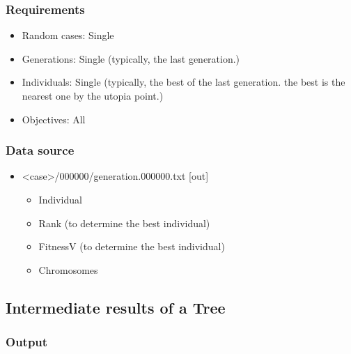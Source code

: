 \documentclass[]{article}
\begin{document}
\subsubsection{Requirements}\label{requirements-3}

\begin{itemize}
\itemsep1pt\parskip0pt
\item
  Random cases: Single
\item
  Generations: Single (typically, the last generation.)
\item
  Individuals: Single (typically, the best of the last generation. the
  best is the nearest one by the utopia point.)
\item
  Objectives: All
\end{itemize}

\subsubsection{Data source}\label{data-source-3}

\begin{itemize}
\itemsep1pt\parskip0pt
\item
  \textless{}case\textgreater{}/000000/generation.000000.txt {[}out{]}

  \begin{itemize}
  \itemsep1pt\parskip0pt
  \item
    Individual
  \item
    Rank (to determine the best individual)
  \item
    FitnessV (to determine the best individual)
  \item
    Chromosomes
  \end{itemize}
\end{itemize}

\subsection{Intermediate results of a
Tree}\label{intermediate-results-of-a-tree}

\subsubsection{Output}\label{output-4}
\end{document}
